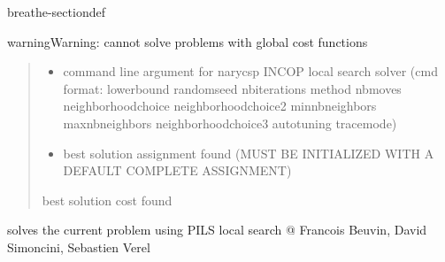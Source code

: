 \documentclass[letterpaper,10pt,openany,oneside,english]{sphinxmanual}
\begin{document}
\begin{fulllineitems}
\begin{sphinxuseclass}{breathe-sectiondef}
\begin{fulllineitems}
\begin{sphinxadmonition}{warning}{Warning:}
\sphinxAtStartPar
cannot solve problems with global cost functions 
\end{sphinxadmonition}
\begin{quote}\begin{description}
\begin{itemize}
\item {} 
\sphinxAtStartPar
{} \textendash{} command line argument for narycsp INCOP local search solver (cmd format: lowerbound randomseed nbiterations method nbmoves neighborhoodchoice neighborhoodchoice2 minnbneighbors maxnbneighbors neighborhoodchoice3 autotuning tracemode) 

\item {} 
\sphinxAtStartPar
{} \textendash{} best solution assignment found (MUST BE INITIALIZED WITH A DEFAULT COMPLETE ASSIGNMENT) 

\end{itemize}

\sphinxAtStartPar
best solution cost found 

\end{description}\end{quote}

\end{fulllineitems}


\begin{fulllineitems}
\label{\detokenize{ref/ref_cpp:_CPPv4N17WeightedCSPSolver4pilsE6stringR6vectorI5ValueE}}\label{\detokenize{ref/ref_cpp:_CPPv3N17WeightedCSPSolver4pilsE6stringR6vectorI5ValueE}}\label{\detokenize{ref/ref_cpp:_CPPv2N17WeightedCSPSolver4pilsE6stringR6vectorI5ValueE}}\label{\detokenize{ref/ref_cpp:WeightedCSPSolver::pils__string.vector:Value:R}}
\pysigstartsignatures
\pysigstartmultiline
{}
\pysigstopmultiline
\pysigstopsignatures
\sphinxAtStartPar
solves the current problem using PILS local search @ Francois Beuvin, David Simoncini, Sebastien Verel 


\end{fulllineitems}
\end{sphinxuseclass}
\end{fulllineitems}
\end{document}
